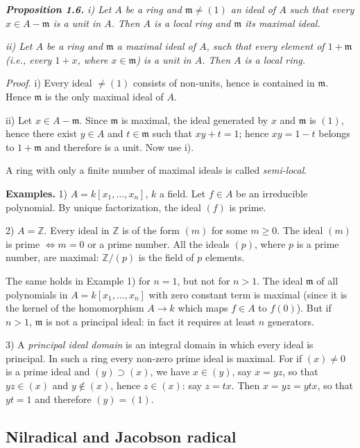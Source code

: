 \medskip
\noindent\textit{\textbf{Proposition 1.6.} i) Let $A$ be a ring and $\mathfrak m\ne(1)$ an ideal of $A$ such that
every $x\in A-\mathfrak m$ is a unit in $A$. Then $A$ is a local ring and $\mathfrak m$ its maximal ideal.}

\noindent\textit{ii) Let $A$ be a ring and $\mathfrak m$ a maximal ideal of $A$, such that every element of
$1+\mathfrak m$ (i.e., every $1+x$, where $x\in\mathfrak m$) is a unit in $A$. Then $A$ is a local ring.}

\noindent\emph{Proof.}  i) Every ideal $\ne(1)$ consists of non-units, hence is contained in $\mathfrak m$.
Hence $\mathfrak m$ is the only maximal ideal of $A$.

ii) Let $x\in A-\mathfrak m$.  Since $\mathfrak m$ is maximal, the ideal generated by $x$ and $\mathfrak m$ is
$(1)$, hence there exist $y\in A$ and $t\in\mathfrak m$ such that $xy+t=1$; hence $xy=1-t$
belongs to $1+\mathfrak m$ and therefore is a unit.  Now use i).\proofbox

A ring with only a finite number of maximal ideals is called \emph{semi-local}.

\medskip
\noindent\textbf{Examples.}  1) $A=k[x_1,\ldots,x_n]$, $k$ a field.  Let $f\in A$ be an irreducible polynomial.  By unique factorization, the ideal $(f)$ is prime.

2) $A=\mathbb Z$.  Every ideal in $\mathbb Z$ is of the form $(m)$ for some $m\geq0$.  The ideal
$(m)$ is prime $\Longleftrightarrow m=0$ or a prime number.  All the ideals $(p)$, where $p$ is a prime
number, are maximal: $\mathbb Z/(p)$ is the field of $p$ elements.

The same holds in Example 1) for $n=1$, but not for $n>1$.  The ideal $\mathfrak m$ of
all polynomials in $A=k[x_1,\ldots,x_n]$ with zero constant term is maximal (since
it is the kernel of the homomorphism $A\longrightarrow k$ which maps $f\in A$ to $f(0)$).  But if
$n>1$, $\mathfrak m$ is not a principal ideal: in fact it requires at least $n$ generators.

3) A \emph{principal ideal domain} is an integral domain in which every ideal is
principal.  In such a ring every non-zero prime ideal is maximal.  For if $(x)\ne0$
is a prime ideal and $(y)\supset(x)$, we have $x\in(y)$, say $x=yz$, so that $yz\in(x)$ and
$y\notin(x)$, hence $z\in(x)$: say $z=tx$.  Then $x=yz=ytx$, so that $yt=1$ and
therefore $(y)=(1)$.

\subsection{Nilradical and Jacobson radical}

